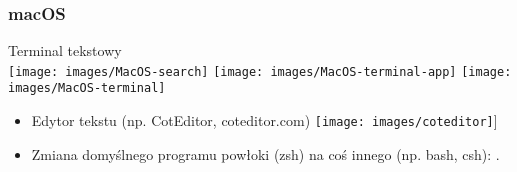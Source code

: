 \begin{frame}
\frametitle{macOS}

\begin{minipage}[t]{.4\textwidth}\vspace{0pt}

 \scriptsize Terminal
 tekstowy\\[1ex] \texttt{[image: images/MacOS-search]}
 \texttt{[image: images/MacOS-terminal-app]}
 \texttt{[image: images/MacOS-terminal]}

\end{minipage}\hfill%
\begin{minipage}[t]{.59\textwidth}\vspace{0pt}

\begin{itemize}\scriptsize

 \item  Edytor tekstu (np. CotEditor, coteditor.com)
 \texttt{[image: images/coteditor]}]

\end{itemize}

\vspace*{-4ex}\begin{itemize}\scriptsize
 \item Zmiana domyślnego programu powłoki (zsh) na coś innego (np. bash,
 csh): .
\end{itemize}
\end{minipage}
\end{frame}





